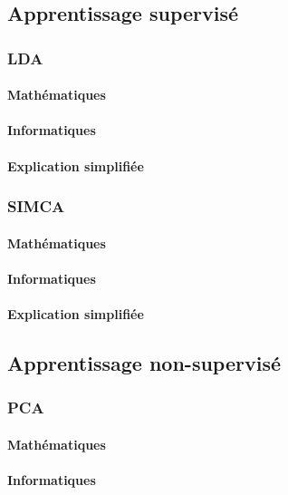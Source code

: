 \documentclass[12pt]{article}
\begin{document}
\subsection{Apprentissage supervisé}

\subsubsection{LDA}

\paragraph{Mathématiques}
\paragraph{Informatiques}
\paragraph{Explication simplifiée}

\subsubsection{SIMCA}

\paragraph{Mathématiques}
\paragraph{Informatiques}
\paragraph{Explication simplifiée}

\subsection{Apprentissage non-supervisé}

\subsubsection{PCA}

\paragraph{Mathématiques}
\paragraph{Informatiques}
\end{document}
